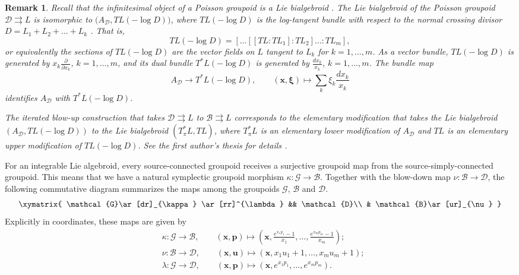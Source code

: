 \documentclass{amsart}
\newtheorem{remark}[theorem]{Remark}
\numberwithin{equation}{section}
\newcommand{\bfp}{{\boldsymbol{p}}}
\newcommand{\bfu}{{\boldsymbol{u}}}
\newcommand{\bfx}{{\boldsymbol{x}}}
\newcommand{\bfxi}{\boldsymbol{\xi}}
\newcommand{\cB}{\mathcal{B}}
\newcommand{\cD}{\mathcal{D}}
\newcommand{\cG}{\mathcal{G}}
\newcommand{\rra}{\rightrightarrows}
\begin{document}
\begin{remark}
  Recall that the infinitesimal object of a Poisson groupoid is a Lie bialgebroid \cite{MX94}.
  The Lie bialgebroid of the Poisson groupoid $\cD \rra L$ is isomorphic to $\big(A_\cD, TL(-\log D)\big)$, where $TL(-\log D)$ is the log-tangent bundle with respect to the normal crossing divisor $D = L_1 + L_2 + \ldots + L_k$ \cite{GL14}.
  That is,
  \[TL(-\log D) = [\ldots[[TL\!:\!TL_1]\!:\!TL_2] \ldots \!:\!TL_m],\]
  or equivalently the sections of $TL(-\log D)$ are the vector fields on $L$ tangent to $L_k$ for $k = 1, \ldots, m$.
  As a vector bundle, $TL(-\log D)$ is generated by $x_k \frac{\partial}{\partial x_k}$, $k = 1, \ldots, m$, and its dual bundle $T^*L(-\log D)$ is generated by $\frac{d x_k}{x_k}$, $k = 1, \ldots, m$.
  The bundle map
  \[A_\cD \to T^*L(-\log D), \qquad (\bfx, \bfxi) \mapsto \sum_k\xi_k\frac{d x_k}{x_k}\]
  identifies $A_\cD$ with $T^*L(-\log D)$.

  The iterated blow-up construction that takes $\cD \rra L$ to $\cB \rra L$ corresponds to the elementary modification that takes the Lie bialgebroid $(A_\cD, TL(-\log D))$ to the Lie bialgebroid $(T^*_\pi L, TL)$, where $T^*_\pi L$ is an elementary lower modification of $A_\cD$ and $TL$ is an elementary upper modification of $TL(-\log D)$.
  See the first author's thesis for details \cite{Li13}.
\end{remark}

For an integrable Lie algebroid, every source-connected groupoid receives a surjective groupoid map from the source-simply-connected groupoid.
This means that we have a natural symplectic groupoid morphism $\kappa:\cG\to\cB$.
Together with the blow-down map $\nu:\cB\to\cD$, the following commutative diagram summarizes the maps among the groupoids $\cG$, $\cB$ and $\cD$.
\begin{equation} 
  \label{eq:LGpdCD}
  \xymatrix{
    \cG  \ar[dr]_{\kappa} \ar[rr]^{\lambda} && \cD \\
      & \cB \ar[ur]_{\nu}
  }
\end{equation}
Explicitly in coordinates, these maps are given by
\begin{align}
  & \kappa: \cG \to \cB, \qquad (\bfx, \bfp) \mapsto \left(\bfx, \frac{e^{x_1p_1}-1}{x_1}, \ldots, \frac{e^{x_mp_m}-1}{x_m}\right); \\
  & \nu: \cB \to \cD, \qquad (\bfx, \bfu) \mapsto (\bfx, x_1u_1+1, \ldots, x_mu_m+1); \\
  & \lambda: \cG \to \cD, \qquad (\bfx, \bfp) \mapsto (\bfx, e^{x_1p_1}, \ldots, e^{x_mp_m}).
\end{align}
\end{document}
